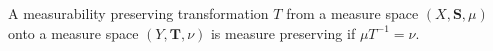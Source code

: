 A measurability preserving transformation $T$ from a measure space $(X, \mathbf{S}, \mu)$ onto a measure space $(Y, \mathbf{T}, \nu)$ is measure preserving if $\mu T^{-1} = \nu$.
